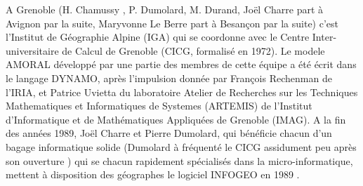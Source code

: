 
A Grenoble (H. Chamussy , P. Dumolard, M. Durand, Joël Charre part à Avignon par la suite, Maryvonne Le Berre part à Besançon par la suite) c’est l’Institut de Géographie Alpine (IGA) qui se coordonne avec le Centre Inter-universitaire de Calcul de Grenoble (CICG, formalisé en 1972). Le modele AMORAL développé par une partie des membres de cette équipe a été écrit dans le langage DYNAMO, après l'impulsion donnée par François Rechenman de l'IRIA, et Patrice Uvietta du laboratoire Atelier de Recherches sur les Techniques Mathematiques et Informatiques de Systemes (ARTEMIS) de l’Institut d'Informatique et de Mathématiques Appliquées de Grenoble (IMAG). A la fin des années 1989, Joël Charre et Pierre Dumolard, qui bénéficie chacun d'un bagage informatique solide (Dumolard à fréquenté le CICG assidument peu après son ouverture \autocite[323]{Cuyala2014}) qui se chacun rapidement spécialisés dans la micro-informatique, mettent à disposition des géographes le logiciel INFOGEO en 1989 \autocites{Charre1989,Theriault1989,Ferrier1991}.  %

